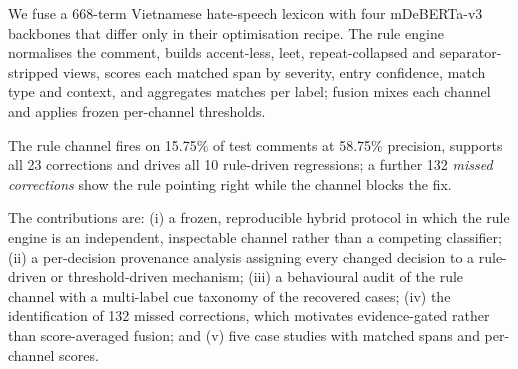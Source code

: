 We fuse a 668-term Vietnamese hate-speech lexicon with four mDeBERTa-v3 backbones that
differ only in their optimisation recipe. The rule engine normalises the comment, builds
accent-less, leet, repeat-collapsed and separator-stripped views, scores each matched
span by severity, entry confidence, match type and context, and aggregates matches per
label; fusion mixes each channel and applies frozen per-channel thresholds.

The rule channel fires on 15.75\% of test comments at 58.75\% precision, supports all
23 corrections and drives all 10 rule-driven regressions; a further 132 \emph{missed
corrections} show the rule pointing right while the \clean{} channel blocks the fix.

The contributions are: (i) a frozen, reproducible hybrid protocol in which the rule
engine is an independent, inspectable channel rather than a competing classifier;
(ii) a per-decision provenance analysis assigning every changed decision to a
rule-driven or threshold-driven mechanism; (iii) a behavioural audit of the rule
channel with a multi-label cue taxonomy of the recovered \hate{} cases; (iv) the
identification of 132 missed corrections, which motivates evidence-gated rather than
score-averaged fusion; and (v) five case studies with matched spans and per-channel
scores.
